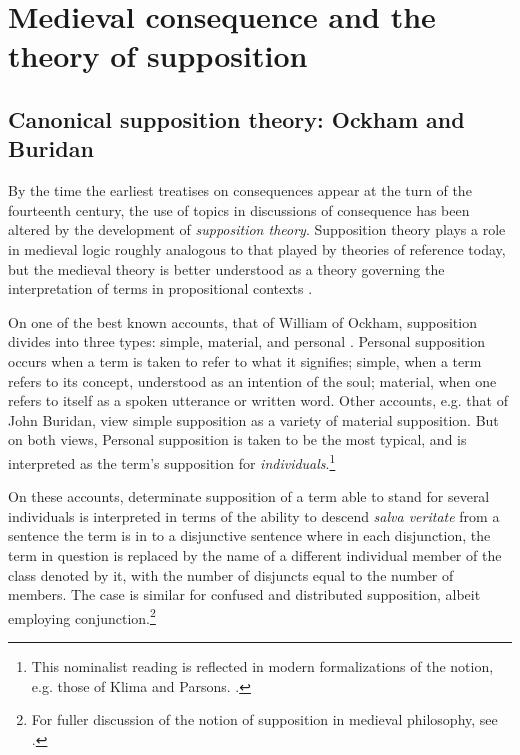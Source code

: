\documentclass[a4paper, 11pt]{article}
\begin{document}
\section{Medieval consequence and the theory of supposition}
\subsection{Canonical supposition theory: Ockham and Buridan}
By the time the earliest treatises on consequences appear at the turn of the fourteenth century, the use of topics in discussions of consequence has been  altered by the development of \emph{supposition theory}. Supposition theory plays a role in medieval logic roughly analogous to that played by theories of reference today, but the medieval theory is better understood as a theory governing the interpretation of terms in propositional contexts \autocite{DutilhNovaes2007,DutilhNovaes2008b}. 

On one of the best known accounts, that of William of Ockham, supposition divides into three types: simple, material, and personal \autocite[193-197]{OckhamSL}. Personal supposition occurs when a term is taken to refer to what it signifies; simple,  when a term refers to its concept, understood as an intention of the soul; material, when one refers to itself as a spoken utterance or written word. Other accounts, e.g. that of John Buridan, view simple supposition as a variety of material supposition. But on both views, Personal supposition is taken to be the most typical, and is interpreted as the term's supposition for \emph{individuals}.\footnote{This nominalist reading is reflected in modern formalizations of the notion, e.g. those of Klima and Parsons. \autocite{Klima1988,Parsons2014}.} 

On these accounts, determinate supposition of a term able to stand for several individuals is interpreted in terms of the ability to descend \emph{salva veritate} from a sentence the term is in to a disjunctive sentence where in each disjunction, the term in question is replaced by the name of a different individual member of the class denoted by it, with the number of disjuncts equal to the number of members. The case is similar for confused and distributed supposition, albeit employing conjunction.\footnote{For fuller discussion of the notion of supposition in medieval philosophy, see \autocite{Klima1988,PriestRead1977,HodgesBurley,Parsons2014}.}

\end{document}
